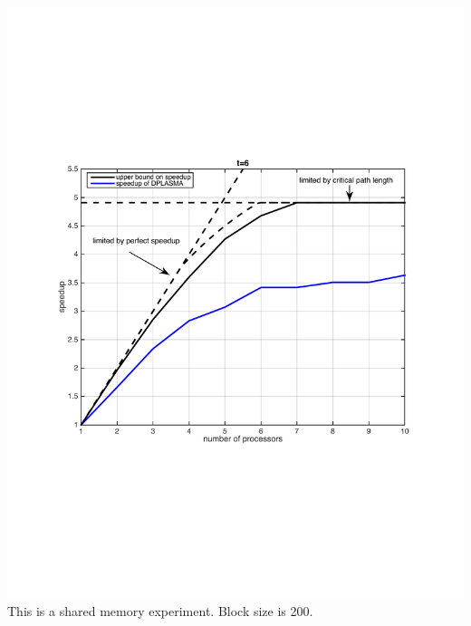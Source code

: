 \begin{frame}

\includegraphics[width=.80\textwidth]{dague_faverge/plot__t6.pdf}\\

This is a shared memory experiment. Block size is 200.


\end{frame}


